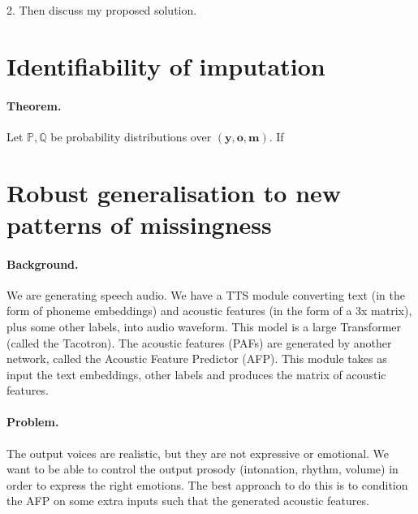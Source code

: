 \documentclass[a4paper,12pt,twoside,openright]{report}
\begin{document}
2. Then discuss my proposed solution.

\section{Identifiability of imputation}

\paragraph{Theorem.} Let $\mathbb{P}, \mathbb{Q}$ be probability distributions over $(\mathbf{y}, \mathbf{o}, \mathbf{m})$. If 

\section{Robust generalisation to new patterns of missingness}

\paragraph{Background.}  We are generating speech audio. We have a TTS module converting text (in the form of phoneme embeddings) and acoustic features (in the form of a 3x matrix), plus some other labels, into audio waveform. This model is a large Transformer (called the Tacotron). The acoustic features (PAFs) are generated by another network, called the Acoustic Feature Predictor (AFP). This module takes as input the text embeddings, other labels and produces the matrix of acoustic features.
\paragraph{Problem.} The output voices are realistic, but they are not expressive or emotional. We want to be able to control the output prosody (intonation, rhythm, volume) in order to express the right emotions. The best approach to do this is to condition the AFP on some extra inputs such that the generated acoustic features.
\end{document}
